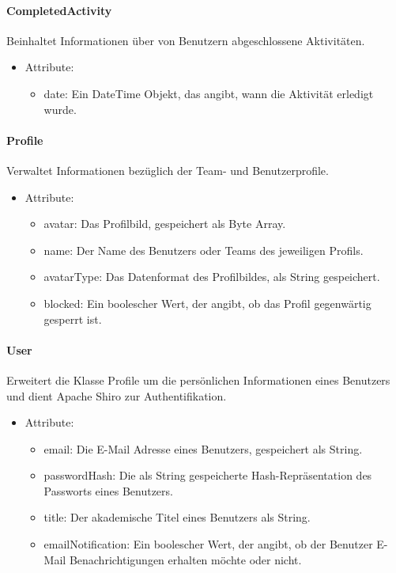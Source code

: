 	\paragraph{CompletedActivity}Beinhaltet Informationen \"uber von Benutzern abgeschlossene Aktivit\"aten.
		\begin{itemize}
			\item Attribute:
			\begin{itemize}
				\item date: Ein DateTime Objekt, das angibt, wann die Aktivit\"at erledigt wurde.
			\end{itemize}
		\end{itemize}
	\paragraph{Profile}Verwaltet Informationen bez\"uglich der Team- und Benutzerprofile.
		\begin{itemize}
			\item Attribute:
			\begin{itemize}
				\item avatar: Das Profilbild, gespeichert als Byte Array.
				\item name: Der Name des Benutzers oder Teams des jeweiligen Profils.
				\item avatarType: Das Datenformat des Profilbildes, als String gespeichert.
				\item blocked: Ein boolescher Wert, der angibt, ob das Profil gegenw\"artig gesperrt ist.
			\end{itemize}
		\end{itemize}
	\paragraph{User}Erweitert die Klasse Profile um die pers\"onlichen Informationen eines Benutzers und dient Apache Shiro zur Authentifikation.
		\begin{itemize}
			\item Attribute:
			\begin{itemize}
				\item email: Die E-Mail Adresse eines Benutzers, gespeichert als String.
				\item passwordHash: Die als String gespeicherte Hash-Repr\"asentation des Passworts eines Benutzers.
				\item title: Der akademische Titel eines Benutzers als String.
				\item emailNotification: Ein boolescher Wert, der angibt, ob der Benutzer E-Mail Benachrichtigungen erhalten m\"ochte oder nicht.
			\end{itemize}
		\end{itemize}
